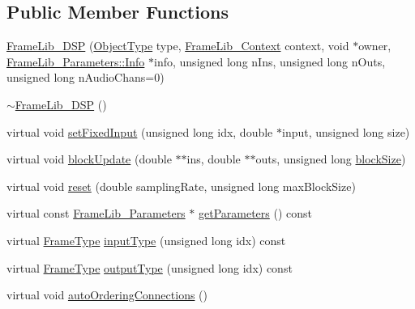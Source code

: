 \subsection*{Public Member Functions}
\begin{DoxyCompactItemize}
\item 
\hyperlink{class_frame_lib___d_s_p_a3f5e89a0ad938ff8e928ec3374b6cf3c}{Frame\+Lib\+\_\+\+D\+SP} (\hyperlink{_frame_lib___types_8h_a842c5e2e69277690b064bf363c017980}{Object\+Type} type, \hyperlink{class_frame_lib___context}{Frame\+Lib\+\_\+\+Context} context, void $\ast$owner, \hyperlink{class_frame_lib___parameters_1_1_info}{Frame\+Lib\+\_\+\+Parameters\+::\+Info} $\ast$info, unsigned long n\+Ins, unsigned long n\+Outs, unsigned long n\+Audio\+Chans=0)
\item 
\hyperlink{class_frame_lib___d_s_p_a2cf489678b72fe7e46956e69fac182ed}{$\sim$\+Frame\+Lib\+\_\+\+D\+SP} ()
\item 
virtual void \hyperlink{class_frame_lib___d_s_p_ad15333614446257796e75db254efac78}{set\+Fixed\+Input} (unsigned long idx, double $\ast$input, unsigned long size)
\item 
virtual void \hyperlink{class_frame_lib___d_s_p_aafa57c93417ced3d5610ca9f6b0f0913}{block\+Update} (double $\ast$$\ast$ins, double $\ast$$\ast$outs, unsigned long \hyperlink{_frame_lib___memory_8cpp_a8ef7d53a4cac28bf580a61f265fcaaa6}{block\+Size})
\item 
virtual void \hyperlink{class_frame_lib___d_s_p_ad253c096a1c7cc236804dfd1f2e650ec}{reset} (double sampling\+Rate, unsigned long max\+Block\+Size)
\item 
virtual const \hyperlink{class_frame_lib___parameters}{Frame\+Lib\+\_\+\+Parameters} $\ast$ \hyperlink{class_frame_lib___d_s_p_a06325d53b4212e692079b748b82bad86}{get\+Parameters} () const
\item 
virtual \hyperlink{_frame_lib___types_8h_ad495a9f61af7fff07d7e97979d1ab854}{Frame\+Type} \hyperlink{class_frame_lib___d_s_p_a774197b0f41e1f78671fab6112a41ed9}{input\+Type} (unsigned long idx) const
\item 
virtual \hyperlink{_frame_lib___types_8h_ad495a9f61af7fff07d7e97979d1ab854}{Frame\+Type} \hyperlink{class_frame_lib___d_s_p_a17b4529624dd9219d502570f81d88b27}{output\+Type} (unsigned long idx) const
\item 
virtual void \hyperlink{class_frame_lib___d_s_p_a8dfb9b1855cc6a829acc1a03dcc4776b}{auto\+Ordering\+Connections} ()
\end{DoxyCompactItemize}
